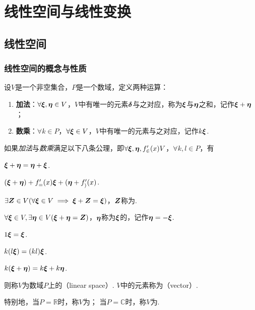 \chapter{线性空间与线性变换}
\section{线性空间}
\subsection{线性空间的概念与性质}
\begin{definition}
设\(V\)是一个非空集合，\(P\)是一个数域，定义两种运算：
\begin{enumerate}
\item {\bf 加法}：\(\forall \a,\b \in V\)，\(V\)中有唯一的元素\(\mat{\delta}\)与之对应，称为\(\a\)与\(\b\)之和，记作\(\a+\b\)；
\item {\bf 数乘}：\(\forall k \in P\)，\(\forall \a \in V\)，\(V\)中有唯一的元素与之对应，记作\(k\a\).
\end{enumerate}

如果\emph{加法}与\emph{数乘}满足以下八条公理，即\(\forall \a,\b,\g \in V\)，\(\forall k,l \in P\)，有

\begin{center}
\begin{minipage}{.8\textwidth}
\begin{axiom}
\(\a+\b=\b+\a\).
\end{axiom}
\begin{axiom}
\((\a+\b)+\g=\a+(\b+\g)\).
\end{axiom}
\begin{axiom}
\(\exists \z \in V (\forall\a \in V \implies \a+\z=\a)\)，\(\z\)称为.
\end{axiom}
\begin{axiom}
\(\forall\a \in V, \exists \mat{\eta} \in V (\a+\mat{\eta}=\z)\)，\(\mat{\eta}\)称为\(\a\)的，记作\(\mat{\eta} = -\a\).
\end{axiom}
\begin{axiom}
\(1\a=\a\).
\end{axiom}
\begin{axiom}
\(k(l\a)=(kl)\a\).
\end{axiom}
\begin{axiom}
\(k(\a+\b)=k\a+k\b\).
\end{axiom}
\end{minipage}
\end{center}

则称\(V\)为数域\(P\)上的（linear space）.
\(V\)中的元素称为（vector）\nolinebreak.

特别地，当\(P = \mathbb{R}\)时，称\(V\)为；
当\(P = \mathbb{C}\)时，称\(V\)为.
\end{definition}

